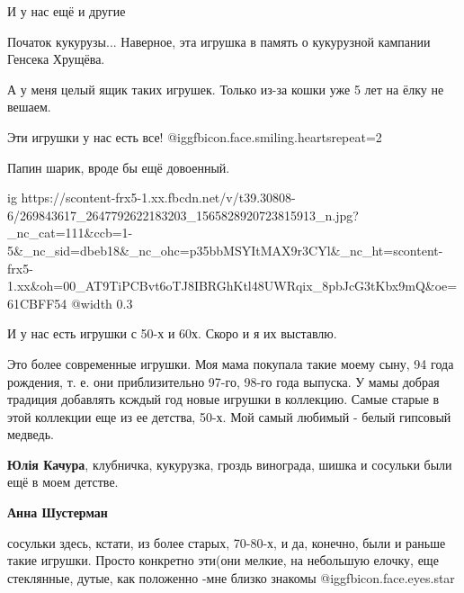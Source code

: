 И у нас ещё и другие

Початок кукурузы...
Наверное, эта игрушка в память о кукурузной кампании Генсека Хрущёва.

А у меня целый ящик таких игрушек. Только из-за кошки уже 5 лет на ёлку не вешаем.

Эти игрушки у нас есть все!  @igg{fbicon.face.smiling.hearts}{repeat=2} 

Папин шарик, вроде бы ещё довоенный.

\ifcmt
  ig https://scontent-frx5-1.xx.fbcdn.net/v/t39.30808-6/269843617_2647792622183203_1565828920723815913_n.jpg?_nc_cat=111&ccb=1-5&_nc_sid=dbeb18&_nc_ohc=p35bbMSYItMAX9r3CYl&_nc_ht=scontent-frx5-1.xx&oh=00_AT9TiPCBvt6oTJ8IBRGhKtl48UWRqix_8pbJcG3tKbx9mQ&oe=61CBFF54
  @width 0.3
\fi

И у нас есть игрушки с 50-х и 60х.
Скоро и я их выставлю.


Это более современные игрушки. Моя мама покупала такие моему сыну, 94 года
рождения, т. е. они приблизительно 97-го, 98-го года выпуска. У мамы добрая
традиция добавлять ксждый год новые игрушки в коллекцию. Самые старые в этой
коллекции еще из ее детства, 50-х. Мой самый любимый - белый гипсовый медведь.

\textbf{Юлія Качура}, клубничка, кукурузка, гроздь винограда, шишка и сосульки были ещё в моем детстве.

\textbf{Анна Шустерман} 

сосульки здесь, кстати, из более старых, 70-80-х, и да, конечно, были и раньше
такие игрушки. Просто конкретно эти(они мелкие, на небольшую елочку, еще
стеклянные, дутые, как положенно -мне близко знакомы @igg{fbicon.face.eyes.star} 
